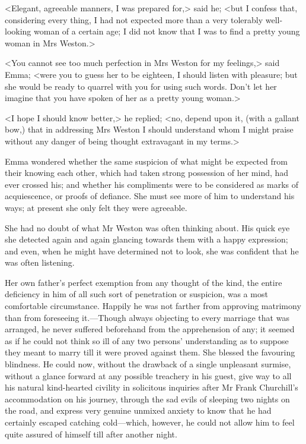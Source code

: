 <Elegant, agreeable manners, I was prepared for,> said he; <but I confess that, considering every thing, I had not expected more than a very tolerably well-looking woman of a certain age; I did not know that I was to find a pretty young woman in Mrs Weston.>

<You cannot see too much perfection in Mrs Weston for my feelings,> said Emma; <were you to guess her to be eighteen, I should listen with pleasure; but she would be ready to quarrel with you for using such words. Don't let her imagine that you have spoken of her as a pretty young woman.>

<I hope I should know better,> he replied; <no, depend upon it, (with a gallant bow,) that in addressing Mrs Weston I should understand whom I might praise without any danger of being thought extravagant in my terms.>

Emma wondered whether the same suspicion of what might be expected from their knowing each other, which had taken strong possession of her mind, had ever crossed his; and whether his compliments were to be considered as marks of acquiescence, or proofs of defiance. She must see more of him to understand his ways; at present she only felt they were agreeable.

She had no doubt of what Mr Weston was often thinking about. His quick eye she detected again and again glancing towards them with a happy expression; and even, when he might have determined not to look, she was confident that he was often listening.

Her own father's perfect exemption from any thought of the kind, the entire deficiency in him of all such sort of penetration or suspicion, was a most comfortable circumstance. Happily he was not farther from approving matrimony than from foreseeing it.—Though always objecting to every marriage that was arranged, he never suffered beforehand from the apprehension of any; it seemed as if he could not think so ill of any two persons' understanding as to suppose they meant to marry till it were proved against them. She blessed the favouring blindness. He could now, without the drawback of a single unpleasant surmise, without a glance forward at any possible treachery in his guest, give way to all his natural kind-hearted civility in solicitous inquiries after Mr Frank Churchill's accommodation on his journey, through the sad evils of sleeping two nights on the road, and express very genuine unmixed anxiety to know that he had certainly escaped catching cold—which, however, he could not allow him to feel quite assured of himself till after another night.

